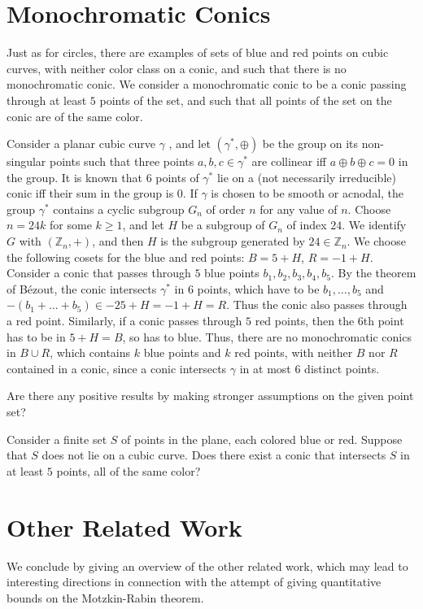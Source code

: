 \documentclass[a4paper,11pt,leqno]{article}
\begin{document}
\section{Monochromatic Conics}
Just as for circles, there are examples of sets of blue and red points on cubic curves, with neither color class on a conic, and such that there is no monochromatic conic.
We consider a monochromatic conic to be a conic passing through at least $5$ points of the set, and such that all points of the set on the conic are of the same color.
\begin{example}
Consider a planar cubic curve $\gamma$ , and let $(\gamma^*,\oplus)$ be the group on its non-singular points such that three points $a,b,c\in\gamma^*$ are collinear iff $a\oplus b\oplus c=0$ in the group.
It is known that $6$ points of $\gamma^*$ lie on a (not necessarily irreducible) conic iff their sum in the group is $0$.
If $\gamma$ is chosen to be smooth or acnodal, the group $\gamma^*$ contains a cyclic subgroup $G_n$ of order $n$ for any value of $n$.
Choose $n=24k$ for some $k\geq 1$, and let $H$ be a subgroup of $G_n$ of index $24$.
We identify $G$ with $(\mathbb{Z}_n,+)$, and then $H$ is the subgroup generated by $24\in\mathbb{Z}_n$.
We choose the following cosets for the blue and red points: $B=5+H$, $R=-1+H$.
Consider a conic that passes through $5$ blue points $b_1,b_2,b_3,b_4,b_5$.
By the theorem of B\'ezout, the conic intersects $\gamma^*$ in $6$ points, which have to be $b_1,\dots,b_5$ and $-(b_1+\dots+b_5)\in -25+H=-1+H=R$.
Thus the conic also passes through a red point.
Similarly, if a conic passes through $5$ red points, then the $6$th point has to be in $5+H=B$, so has to blue.
Thus, there are no monochromatic conics in $B\cup R$, which contains $k$ blue points and $k$ red points, with neither $B$ nor $R$ contained in a conic, since a conic intersects $\gamma$ in at most $6$ distinct points.
\end{example}
Are there any positive results by making stronger assumptions on the given point set?
\begin{question}
Consider a finite set $S$ of points in the plane, each colored blue or red.
Suppose that $S$ does not lie on a cubic curve.
Does there exist a conic that intersects $S$ in at least $5$ points, all of the same color?
\end{question}




\section{Other Related Work}\label{related-work}
We conclude by giving an overview of the other related work, which may lead to interesting directions in connection with the attempt of giving quantitative bounds on the Motzkin-Rabin theorem. 
\end{document}
